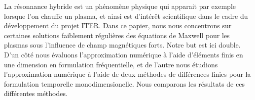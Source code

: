 La r\'esonnance hybride est un ph\'enom\`ene physique qui apparait par exemple lorsque l'on chauffe un plasma, et 
ainsi est d'int\'er\^et scientifique dans le cadre du d\'eveloppement  du projet ITER. Dans ce papier, nous nous concentrons sur certaines  solutions faiblement r\'eguli\`eres des \'equations de Maxwell pour les plasmas sous l'influence de champ magn\'etiques forts. Notre but est ici double. D'un c\^ot\'e nous \'evaluons l'approximation 
num\'erique \`a l'aide d'\'el\'ements finis en une dimension en formulation 
fr\'equentielle, et de l'autre nous \'etudions l'approximation num\'erique \`a l'aide de deux m\'ethodes de  diff\'erences finies pour la formulation
temporelle monodimensionelle. Nous comparons les r\'esultats de ces  diff\'erentes m\'ethodes.
